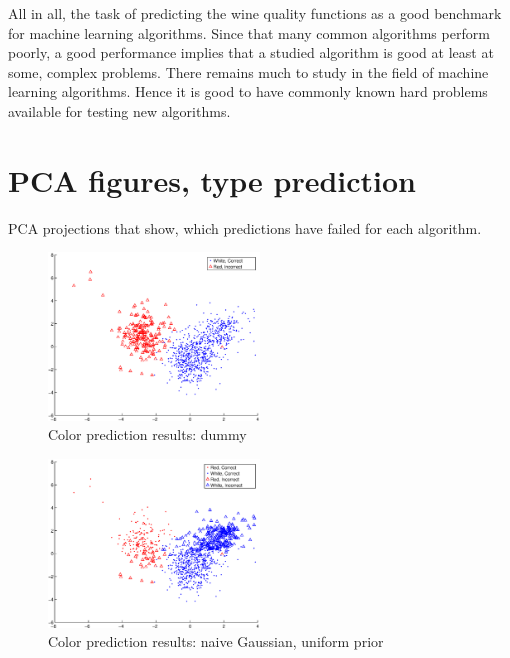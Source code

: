 \documentclass[twoside]{article}
\begin{document}
\begin{multicols}{2}
All in all, the task of predicting the wine quality functions as a good benchmark for machine learning algorithms. Since
that many common algorithms perform poorly, a good performance implies that a studied algorithm is good at least at some, complex problems.
There remains much to study in the field of machine learning algorithms. Hence it is good to have commonly known hard problems available for testing
new algorithms.



{}

\appendix

\section{PCA figures, type prediction}\label{appendix:colorpcakuvet}
PCA projections that show, which predictions have failed for each algorithm.

\begin{figure}[H]
\centering
\includegraphics[width=0.5\textwidth]{colorpca/dummy}
\caption{Color prediction results: dummy}
\end{figure}

\begin{figure}[H]
\centering
\includegraphics[width=0.5\textwidth]{colorpca/naive_noprior}
\caption{Color prediction results: naive Gaussian, uniform prior}
\end{figure}


\end{multicols}
\end{document}
